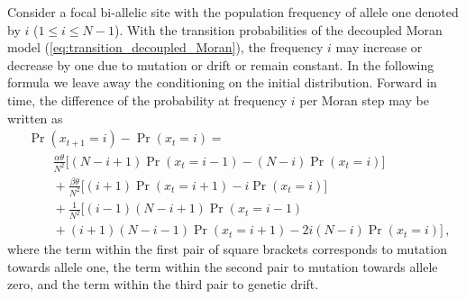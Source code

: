 \documentclass[preprint]{elsarticle}
\newcommand\x[1]{\ensuremath{x_{#1}}}
\begin{document}
Consider a focal bi-allelic site with the population frequency of allele one denoted by $i$ ($1 \leq i \leq N-1$). With the transition probabilities of the decoupled Moran model (\ref{eq:transition_decoupled_Moran}), the frequency $i$ may increase or decrease by one due to mutation or drift or remain constant. In the following formula we leave away the conditioning on the initial distribution. Forward in time, the difference of the probability at frequency $i$ per Moran step may be written as
\begin{equation}\label{eq:forw_discr_mutation}
\begin{split}
&\Pr(\x{t+1}=i)-\Pr(\x{t}=i) = \\
&\qquad \frac{\alpha\theta}{N^2} \bigg[(N-i+1)\Pr(\x{t}=i-1) - (N-i)\Pr(\x{t}=i)\bigg]\\
&\qquad+\frac{\beta\theta}{N^2} \bigg[(i+1)\Pr(\x{t}=i+1) - i\Pr(\x{t}=i)\bigg]\\
&\qquad+\frac1{N^2}\bigg[(i-1)(N-i+1)\Pr(\x{t}=i-1) \\
&\qquad+ (i+1)(N-i-1)\Pr(\x{t}=i+1)-2i(N-i)\Pr(\x{t}=i)\bigg]\,,
\end{split}
\end{equation}
where the term within the first pair of square brackets corresponds to mutation towards allele one, the term within the second pair to mutation towards allele zero, and the term within the third pair to genetic drift.
\end{document}
